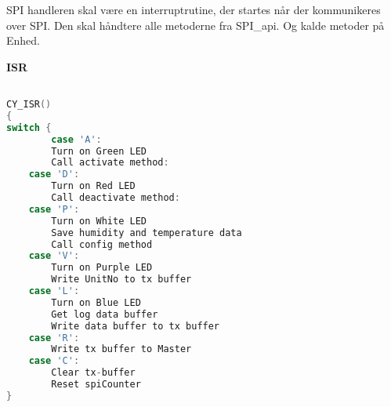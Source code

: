 
SPI handleren skal være en interruptrutine, der startes når der kommunikeres over SPI. Den skal håndtere alle metoderne fra SPI\_api. Og kalde metoder på Enhed.

\textbf{ISR}

\begin{lstlisting}[language=C]

CY_ISR()
{
switch {
    	case 'A':
		Turn on Green LED
		Call activate method:                
	case 'D':
		Turn on Red LED
		Call deactivate method:  
	case 'P':
		Turn on White LED			
		Save humidity and temperature data            
		Call config method
	case 'V':
		Turn on Purple LED  
		Write UnitNo to tx buffer  
	case 'L':
		Turn on Blue LED
		Get log data buffer
		Write data buffer to tx buffer
	case 'R':
		Write tx buffer to Master
	case 'C':
		Clear tx-buffer
		Reset spiCounter 
}
\end{lstlisting}